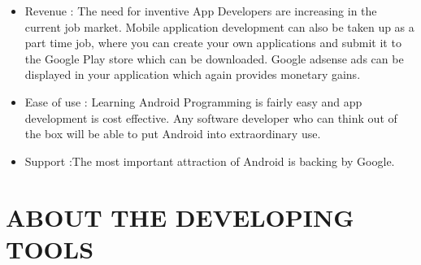 \documentclass[a4paper,12pt]{article}
\begin{document}
\begin{itemize}
\item Revenue : The need for inventive App Developers are increasing in the current job market. Mobile application development can also be taken up as a part time job, where you can create your own applications and submit it to the Google Play store which can be downloaded. Google adsense ads can be displayed in your application which again provides monetary gains.
\item Ease of use : Learning Android Programming is fairly easy and app development is cost effective. Any software developer who can think out of the box will be able to put Android into extraordinary use.
\item Support :The most important attraction of Android is backing by Google.
\end{itemize}
\par\vspace{2mm}
\newpage
\section{ABOUT THE DEVELOPING TOOLS}\vspace{5mm}
\end{document}
